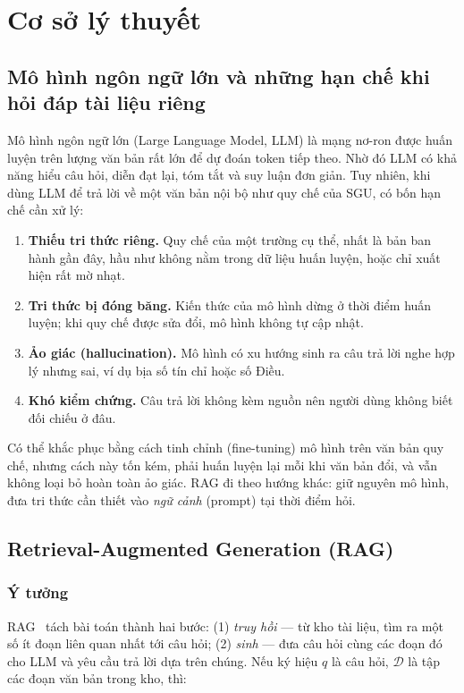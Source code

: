 \chapter{Cơ sở lý thuyết}
\label{ch:co-so-ly-thuyet}


\section{Mô hình ngôn ngữ lớn và những hạn chế khi hỏi đáp tài liệu riêng}

Mô hình ngôn ngữ lớn (Large Language Model, LLM) là mạng nơ-ron được huấn luyện trên lượng văn bản rất lớn để dự đoán token tiếp theo. Nhờ đó LLM có khả năng hiểu câu hỏi, diễn đạt lại, tóm tắt và suy luận đơn giản. Tuy nhiên, khi dùng LLM để trả lời về một văn bản nội bộ như quy chế của SGU, có bốn hạn chế cần xử lý:

\begin{enumerate}
  \item \textbf{Thiếu tri thức riêng.} Quy chế của một trường cụ thể, nhất là bản ban hành gần đây, hầu như không nằm trong dữ liệu huấn luyện, hoặc chỉ xuất hiện rất mờ nhạt.
  \item \textbf{Tri thức bị đóng băng.} Kiến thức của mô hình dừng ở thời điểm huấn luyện; khi quy chế được sửa đổi, mô hình không tự cập nhật.
  \item \textbf{Ảo giác (hallucination).} Mô hình có xu hướng sinh ra câu trả lời nghe hợp lý nhưng sai, ví dụ bịa số tín chỉ hoặc số Điều.
  \item \textbf{Khó kiểm chứng.} Câu trả lời không kèm nguồn nên người dùng không biết đối chiếu ở đâu.
\end{enumerate}

Có thể khắc phục bằng cách tinh chỉnh (fine-tuning) mô hình trên văn bản quy chế, nhưng cách này tốn kém, phải huấn luyện lại mỗi khi văn bản đổi, và vẫn không loại bỏ hoàn toàn ảo giác. RAG đi theo hướng khác: giữ nguyên mô hình, đưa tri thức cần thiết vào \emph{ngữ cảnh} (prompt) tại thời điểm hỏi.

\section{Retrieval-Augmented Generation (RAG)}

\subsection{Ý tưởng}

RAG~\cite{lewis2020rag,gao2023ragsurvey} tách bài toán thành hai bước: (1) \emph{truy hồi} --- từ kho tài liệu, tìm ra một số ít đoạn liên quan nhất tới câu hỏi; (2) \emph{sinh} --- đưa câu hỏi cùng các đoạn đó cho LLM và yêu cầu trả lời dựa trên chúng. Nếu ký hiệu $q$ là câu hỏi, $\mathcal{D}$ là tập các đoạn văn bản trong kho, thì:

